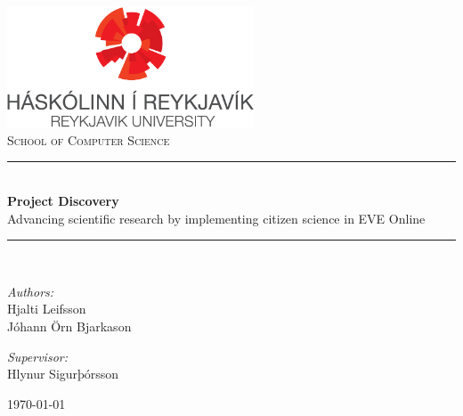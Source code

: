  \newcommand{\HRule}{\rule{\linewidth}{0.5mm}}
\begin{titlepage}

\begin{center}
\includegraphics[width=0.55\textwidth]{./graphics/rulogo}\\[0.7cm]    

\textsc{\LARGE School of Computer Science}\\[3.0cm]

\HRule \\[0.4cm]
{ \Huge \bfseries Project Discovery}\\[0.2cm]

\Large Advancing scientific research by implementing citizen science in EVE Online\\[0.1cm]

\HRule \\[1.5cm]


\begin{minipage}{0.49\textwidth}
\begin{flushleft} \large
\emph{Authors:}\\
Hjalti Leifsson \\
Jóhann Örn Bjarkason
\end{flushleft}
\end{minipage}
\begin{minipage}{0.49\textwidth}
\begin{flushright} \large
\emph{Supervisor:} \\
Hlynur Sigurþórsson
\end{flushright}
\end{minipage}

\vfill

{\large \today}



\end{center}

\end{titlepage}